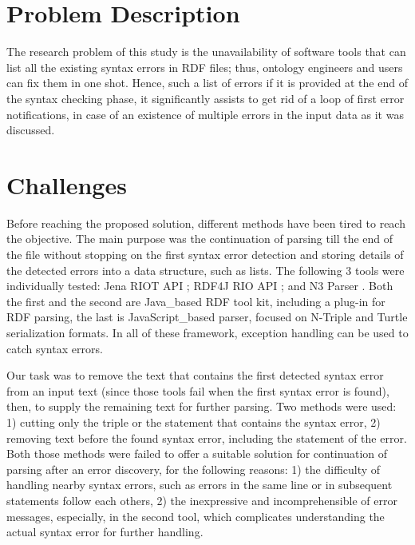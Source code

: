 \section{Problem Description } 	
The research problem of this study is the unavailability of software tools that can list all the existing syntax errors in RDF files; thus, ontology engineers and users can fix them in one shot. Hence, such a list of errors if it is provided at the end of the syntax checking phase, it significantly assists to get rid of a loop of first error notifications, in case of an existence of multiple errors  in the input data as it was discussed.  

\section{Challenges}
Before reaching the proposed solution, different methods have been tired to reach the objective. The main purpose was the continuation of parsing till the end of the file without stopping on the first syntax error detection  and storing details of the detected errors into a data structure, such as lists. The following 3 tools were individually tested: Jena RIOT API \cite{McBride:2002:JSW:613357.613755}; RDF4J RIO  API \cite{RDF4J:Online}; and  N3 Parser \cite{N3Parser:Online}. Both the first and the second are Java\_based RDF tool kit, including a plug-in for RDF parsing, the last is JavaScript\_based parser, focused on N-Triple and Turtle serialization formats. In all of these framework, exception handling can be used to catch syntax errors. 

Our task was to remove the text that contains the first detected syntax error from an input text (since those tools fail when the first syntax error is found), then, to supply the remaining text for further parsing. Two methods were used: 1) cutting only the triple or the statement that contains the syntax error, 2) removing text before the found syntax error, including the statement of the error. Both those methods were failed to offer a suitable solution for continuation of parsing after an error discovery, for the following reasons: 1) the difficulty of handling nearby syntax errors, such as errors in the same line or in subsequent statements follow each others, 2) the inexpressive and incomprehensible of error messages, especially, in the second tool, which complicates understanding the actual syntax error for further handling.    


